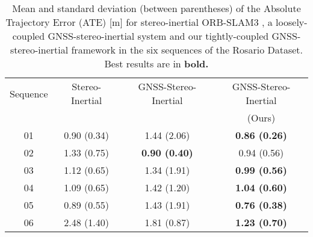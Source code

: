 \begin{table}[!tp]
    \centering
    \caption{Mean and standard deviation (between parentheses) of the Absolute Trajectory Error (ATE) [\si{\metre}] for stereo-inertial ORB-SLAM3 \cite{campos2021orbslam3}, a loosely-coupled GNSS-stereo-inertial system \cite{qin2019general} and our tightly-coupled GNSS-stereo-inertial framework in the six sequences of the Rosario Dataset. Best results are in \bf{bold}.}
    
    \resizebox{\linewidth}{!} {
        \begin{tabular}{cccc}
        \hline
                    Sequence & Stereo-Inertial & GNSS-Stereo-Inertial & GNSS-Stereo-Inertial \\
                    & \cite{campos2021orbslam3} & \cite{qin2019general} & (Ours) \\
                    \hline
        01 &  0.90 (0.34)                  &
        1.44 (2.06) &
        \bf{0.86 (0.26)}                \\
        02 &  1.33 (0.75)                  &        \bf{0.90 (0.40)} &
        0.94 (0.56)                 \\
        03 &  1.12 (0.65)                  & 1.34 (1.91) & \bf{0.99 (0.56)}                \\
        04 & 1.09 (0.65)                   & 1.42 (1.20) &
        \bf{1.04 (0.60)}                \\
        05 &  0.89 (0.55)                  & 1.43 (1.91) & \bf{0.76 (0.38)}                \\
        06 & 2.48 (1.40)                   & 1.81 (0.87) &  \bf{1.23 (0.70)}     \\ \hline
        \end{tabular}
    }
    \label{tab:rosario_results}
\end{table}